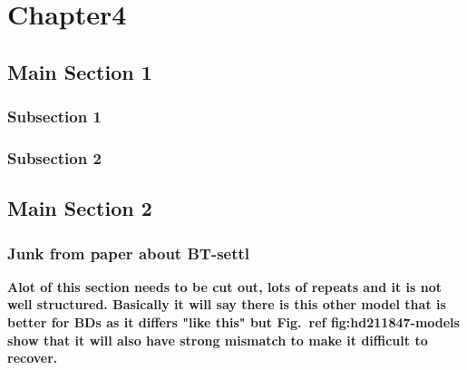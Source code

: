 
\chapter{Chapter4}  %

\label{cha:companion-recovery}


\section{Main Section 1}



\subsection{Subsection 1}



\subsection{Subsection 2}


\section{Main Section 2}




\subsection{Junk from paper about BT-settl}


\textbf{Alot of this section needs to be cut out, lots of repeats and it is not well structured. Basically it will say there is this other model that is better for BDs as it differs "like this" but Fig.~\textbf{ref {fig:hd211847-models}} show that it will also have strong mismatch to make it difficult to recover.}

